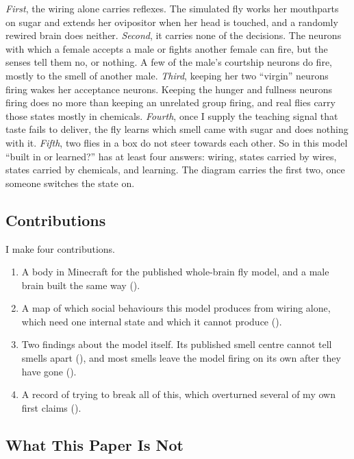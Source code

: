 \emph{First}, the wiring alone carries reflexes. The simulated fly works her mouthparts on sugar and extends her ovipositor when her head is touched, and a randomly rewired brain does neither. \emph{Second}, it carries none of the decisions. The neurons with which a female accepts a male or fights another female can fire, but the senses tell them no, or nothing. A few of the male's courtship neurons do fire, mostly to the smell of another male. \emph{Third}, keeping her two ``virgin'' neurons firing wakes her acceptance neurons. Keeping the hunger and fullness neurons firing does no more than keeping an unrelated group firing, and real flies carry those states mostly in chemicals. \emph{Fourth}, once I supply the teaching signal that taste fails to deliver, the fly learns which smell came with sugar and does nothing with it. \emph{Fifth}, two flies in a box do not steer towards each other. So in this model ``built in or learned?'' has at least four answers: wiring, states carried by wires, states carried by chemicals, and learning. The diagram carries the first two, once someone switches the state on.

\subsection{Contributions}

I make four contributions.

\begin{enumerate}[leftmargin=*]
  \item A body in Minecraft for the published whole-brain fly model, and a male brain built the same way ().
  \item A map of which social behaviours this model produces from wiring alone, which need one internal state and which it cannot produce ().
  \item Two findings about the model itself. Its published smell centre cannot tell smells apart (), and most smells leave the model firing on its own after they have gone ().
  \item A record of trying to break all of this, which overturned several of my own first claims ().
\end{enumerate}

\subsection{What This Paper Is Not}

